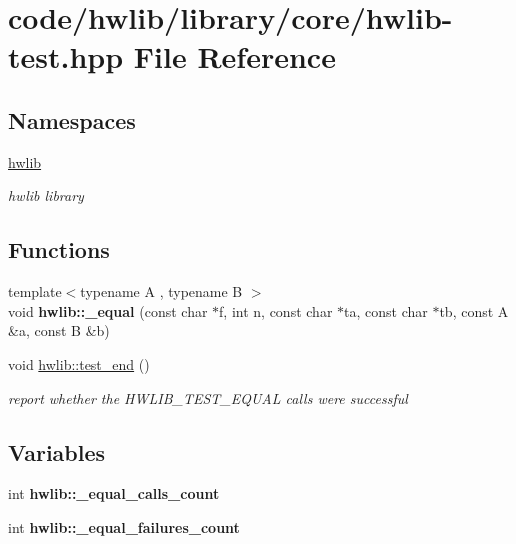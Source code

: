 \hypertarget{hwlib-test_8hpp}{}\section{code/hwlib/library/core/hwlib-\/test.hpp File Reference}
\label{hwlib-test_8hpp}
\subsection*{Namespaces}
\begin{DoxyCompactItemize}
\item 
 \hyperlink{namespacehwlib}{hwlib}
\begin{DoxyCompactList}\small\item\em hwlib library \end{DoxyCompactList}\end{DoxyCompactItemize}
\subsection*{Functions}
\begin{DoxyCompactItemize}
\item 
\mbox{\label{namespacehwlib_a967170cbb46d2043a348573f9f6d1459}} 
{\footnotesize template$<$typename A , typename B $>$ }\\void {\bfseries hwlib\+::\+\_\+equal} (const char $\ast$f, int n, const char $\ast$ta, const char $\ast$tb, const A \&a, const B \&b)
\item 
void \hyperlink{namespacehwlib_af30c15244b6a508f320f01317dc84d7f}{hwlib\+::test\+\_\+end} ()
\begin{DoxyCompactList}\small\item\em report whether the H\+W\+L\+I\+B\+\_\+\+T\+E\+S\+T\+\_\+\+E\+Q\+U\+AL calls were successful \end{DoxyCompactList}\end{DoxyCompactItemize}
\subsection*{Variables}
\begin{DoxyCompactItemize}
\item 
\mbox{\label{namespacehwlib_ac49c08f9450b384a6441e6abee3a231a}} 
int {\bfseries hwlib\+::\+\_\+equal\+\_\+calls\+\_\+count}
\item 
\mbox{\label{namespacehwlib_a2b1f7bbf18cbd895e4ba597d91c43797}} 
int {\bfseries hwlib\+::\+\_\+equal\+\_\+failures\+\_\+count}
\end{DoxyCompactItemize}
